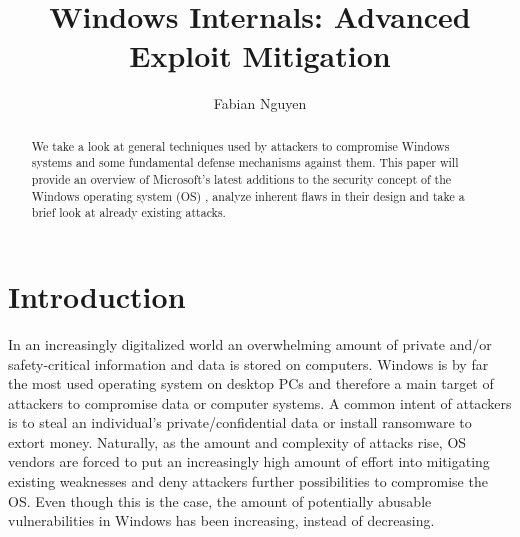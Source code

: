 \documentclass[10pt,twocolumn,a4paper]{article}
\author{Fabian Nguyen}
\begin{document}
\title{Windows Internals: Advanced Exploit Mitigation}

\newcommand{\todo}[1]{{\texttt{[#1]}}}
\newcommand{\code}[1]{{\tt \small{#1}}}

\maketitle


\begin{abstract}
We take a look at general techniques used by attackers to compromise Windows systems and some fundamental defense mechanisms against them.
This paper will provide an overview of Microsoft's latest additions to the security concept of the Windows operating system (OS) , analyze inherent flaws in their design and take a brief look at already existing attacks. 
\end{abstract}

\section{Introduction}\label{sec:introduction}
In an increasingly digitalized world an overwhelming amount of private and/or safety-critical information and data is stored on computers.
Windows is by far the most used operating system on desktop PCs \cite{OSshare} and therefore a main target of attackers to compromise data or computer systems.
A common intent of attackers is to steal an individual's private/confidential data or install ransomware to extort money.
Naturally, as the amount and complexity of attacks rise, OS vendors are forced to put an increasingly high amount of effort into mitigating existing weaknesses and deny attackers  further possibilities to compromise the OS.
Even though this is the case, the amount of potentially abusable vulnerabilities in Windows has been increasing, instead of decreasing.
\end{document}

